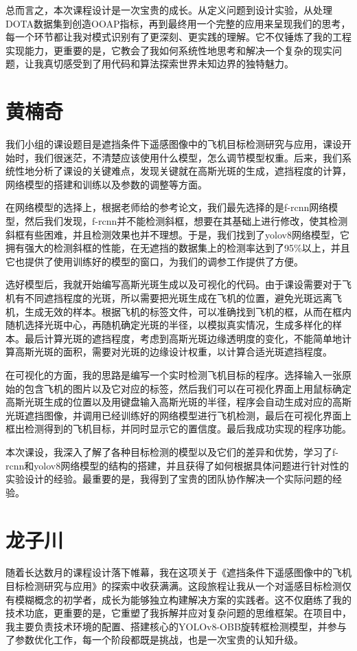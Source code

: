 \documentclass[12pt, a4paper]{report}
\begin{document}
总而言之，本次课程设计是一次宝贵的成长。从定义问题到设计实验，从处理DOTA数据集到创造OOAP指标，再到最终用一个完整的应用来呈现我们的思考，每一个环节都让我对模式识别有了更深刻、更实践的理解。它不仅锤炼了我的工程实现能力，更重要的是，它教会了我如何系统性地思考和解决一个复杂的现实问题，让我真切感受到了用代码和算法探索世界未知边界的独特魅力。

\vfill

\section{黄楠奇}
我们小组的课设题目是遮挡条件下遥感图像中的飞机目标检测研究与应用，课设开始时，我们很迷茫，不清楚应该使用什么模型，怎么调节模型权重。后来，我们系统性地分析了课设的关键难点，发现关键就在高斯光斑的生成，遮挡程度的计算，网络模型的搭建和训练以及参数的调整等方面。

在网络模型的选择上，根据老师给的参考论文，我们最先选择的是f-rcnn网络模型，然后我们发现，f-rcnn并不能检测斜框，想要在其基础上进行修改，使其检测斜框有些困难，并且检测效果也并不理想。于是，我们找到了yolov8网络模型，它拥有强大的检测斜框的性能，在无遮挡的数据集上的检测率达到了95\%以上，并且它也提供了使用训练好的模型的窗口，为我们的调参工作提供了方便。

选好模型后，我就开始编写高斯光斑生成以及可视化的代码。由于课设需要对于飞机有不同遮挡程度的光斑，所以需要把光斑生成在飞机的位置，避免光斑远离飞机，生成无效的样本。根据飞机的标签文件，可以准确找到飞机的框，从而在框内随机选择光斑中心，再随机确定光斑的半径，以模拟真实情况，生成多样化的样本。最后计算光斑的遮挡程度，考虑到高斯光斑边缘透明度的变化，不能简单地计算高斯光斑的面积，需要对光斑的边缘设计权重，以计算合适光斑遮挡程度。

在可视化的方面，我的思路是编写一个实时检测飞机目标的程序。选择输入一张原始的包含飞机的图片以及它对应的标签，然后我们可以在可视化界面上用鼠标确定高斯光斑生成的位置以及用键盘输入高斯光斑的半径，程序会自动生成对应的高斯光斑遮挡图像，并调用已经训练好的网络模型进行飞机检测，最后在可视化界面上框出检测得到的飞机目标，并同时显示它的置信度。最后我成功实现的程序功能。

本次课设，我深入了解了各种目标检测的模型以及它们的差异和优势，学习了f-rcnn和yolov8网络模型的结构的搭建，并且获得了如何根据具体问题进行针对性的实验设计的经验。最重要的是，我得到了宝贵的团队协作解决一个实际问题的经验。


\vfill

\section{龙子川}
随着长达数月的课程设计落下帷幕，我在这项关于《遮挡条件下遥感图像中的飞机目标检测研究与应用》的探索中收获满满。这段旅程让我从一个对遥感目标检测仅有模糊概念的初学者，成长为能够独立构建解决方案的实践者。这不仅磨练了我的技术功底，更重要的是，它重塑了我拆解并应对复杂问题的思维框架。在项目中，我主要负责技术环境的配置、搭建核心的YOLOv8-OBB旋转框检测模型，并参与了参数优化工作，每一个阶段都既是挑战，也是一次宝贵的认知升级。
\end{document}
